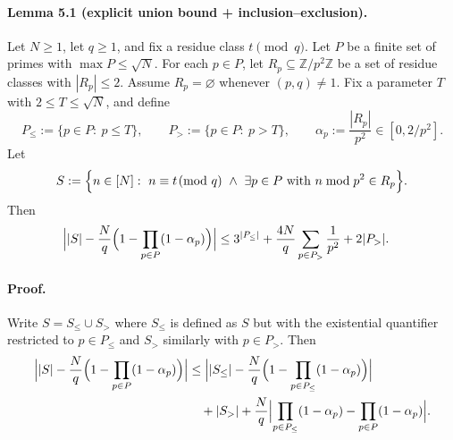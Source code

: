 \paragraph{Lemma 5.1 (explicit union bound + inclusion--exclusion).}
Let $N\ge 1$, let $q\ge 1$, and fix a residue class $t\pmod q$.
Let $P$ be a finite set of primes with $\max P\le \sqrt N$.
For each $p\in P$, let $R_p\subseteq\mathbb Z/p^2\mathbb Z$ be a set of residue classes with $|R_p|\le 2$.
Assume $R_p=\varnothing$ whenever $(p,q)\ne 1$.
Fix a parameter $T$ with $2\le T\le \sqrt N$, and define
\[
P_{\le}:=\{p\in P:\ p\le T\},\qquad P_{>}:=\{p\in P:\ p>T\},\qquad \alpha_p:=\frac{|R_p|}{p^2}\in[0,2/p^2].
\]
Let
\[
S:=\Bigl\{n\in[N]:\ n\equiv t\!\!\pmod q\ \wedge\ \exists p\in P\ \text{with}\ n\bmod p^2\in R_p\Bigr\}.
\]
Then
\begin{align*}
\Bigl||S|-\frac{N}{q}\Bigl(1-\prod_{p\in P}(1-\alpha_p)\Bigr)\Bigr|
&\le 3^{|P_{\le}|}+\frac{4N}{q}\sum_{p\in P_{>}}\frac{1}{p^2}+2|P_{>}|.
\end{align*}

\paragraph{Proof.}
Write $S=S_{\le}\cup S_{>}$ where $S_{\le}$ is defined as $S$ but with the existential quantifier restricted to $p\in P_{\le}$ and $S_{>}$ similarly with $p\in P_{>}$.
Then
\begin{align}
\Bigl||S|-\frac{N}{q}\Bigl(1-\prod_{p\in P}(1-\alpha_p)\Bigr)\Bigr|
&\le
\Bigl||S_{\le}|-\frac{N}{q}\Bigl(1-\prod_{p\in P_{\le}}(1-\alpha_p)\Bigr)\Bigr|
\label{eq:triangle1}\\
&\quad + |S_{>}|
+ \frac{N}{q}\Bigl|\prod_{p\in P_{\le}}(1-\alpha_p)-\prod_{p\in P}(1-\alpha_p)\Bigr|.
\nonumber
\end{align}

